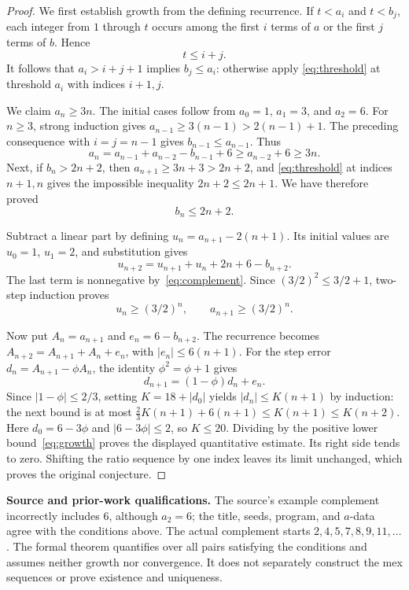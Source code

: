 \documentclass[11pt]{article}
\begin{document}
\begin{proof}
We first establish growth from the defining recurrence. If $t<a_i$ and
$t<b_j$, each integer from $1$ through $t$ occurs among the first $i$
terms of $a$ or the first $j$ terms of $b$. Hence
\begin{equation}\label{eq:threshold}
 t\le i+j.
\end{equation}
It follows that $a_i>i+j+1$ implies $b_j\le a_i$: otherwise apply
\eqref{eq:threshold} at threshold $a_i$ with indices $i+1,j$.

We claim $a_n\ge3n$. The initial cases follow from
$a_0=1$, $a_1=3$, and $a_2=6$. For $n\ge3$, strong induction gives
$a_{n-1}\ge3(n-1)>2(n-1)+1$. The preceding consequence with
$i=j=n-1$ gives $b_{n-1}\le a_{n-1}$. Thus
\[
 a_n=a_{n-1}+a_{n-2}-b_{n-1}+6
 \ge a_{n-2}+6\ge3n.
\]
Next, if $b_n>2n+2$, then $a_{n+1}\ge3n+3>2n+2$, and
\eqref{eq:threshold} at indices $n+1,n$ gives the impossible inequality
$2n+2\le2n+1$. We have therefore proved
\begin{equation}\label{eq:complement}
 b_n\le2n+2.
\end{equation}

Subtract a linear part by defining $u_n=a_{n+1}-2(n+1)$. Its initial
values are $u_0=1$, $u_1=2$, and substitution gives
\[
 u_{n+2}=u_{n+1}+u_n+2n+6-b_{n+2}.
\]
The last term is nonnegative by~\eqref{eq:complement}. Since
$(3/2)^2\le3/2+1$, two-step induction proves
\begin{equation}\label{eq:growth}
 u_n\ge(3/2)^n,\qquad a_{n+1}\ge(3/2)^n.
\end{equation}

Now put $A_n=a_{n+1}$ and $e_n=6-b_{n+2}$. The recurrence becomes
$A_{n+2}=A_{n+1}+A_n+e_n$, with $|e_n|\le6(n+1)$.
For the step error $d_n=A_{n+1}-\phi A_n$, the identity
$\phi^2=\phi+1$ gives
\[
 d_{n+1}=(1-\phi)d_n+e_n.
\]
Since $|1-\phi|\le2/3$, setting $K=18+|d_0|$ yields
$|d_n|\le K(n+1)$ by induction: the next bound is at most
$\tfrac23K(n+1)+6(n+1)\le K(n+1)\le K(n+2)$.
Here $d_0=6-3\phi$ and $|6-3\phi|\le2$, so $K\le20$.
Dividing by the positive lower bound~\eqref{eq:growth} proves the
displayed quantitative estimate. Its right side tends to zero. Shifting
the ratio sequence by one index leaves its limit unchanged, which proves
the original conjecture.
\end{proof}

\textbf{Source and prior-work qualifications.}
The source's example complement incorrectly includes $6$, although
$a_2=6$; the title, seeds, program, and $a$-data agree with the conditions
above. The actual complement starts $2,4,5,7,8,9,11,\ldots$.
The formal theorem quantifies over all pairs satisfying the conditions
and assumes neither growth nor convergence. It does not separately
construct the mex sequences or prove existence and uniqueness.
\end{document}
